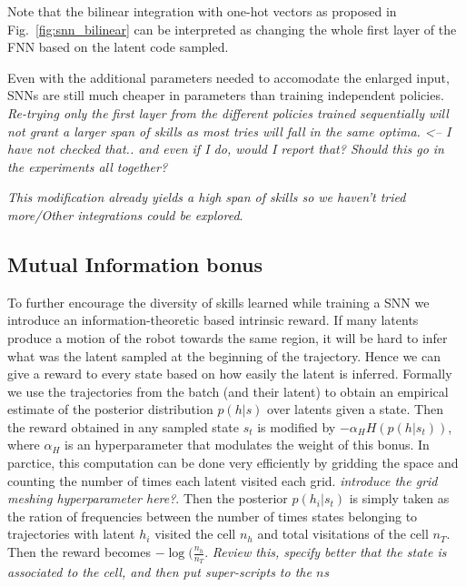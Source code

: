 \documentclass{article} %
\begin{document}
Note that the bilinear integration with one-hot vectors as proposed in Fig.\ \ref{fig:snn_bilinear} can be interpreted as changing the whole first layer of the FNN based on the latent code sampled. 

Even with the additional parameters needed to accomodate the enlarged input, SNNs are still much cheaper in parameters than training independent policies.\textit{ Re-trying only the first layer from the different policies trained sequentially will not grant a larger span of skills as most tries will fall in the same optima. <-- I have not checked that.. and even if I do, would I report that? Should this go in the experiments all together?}

\textit{This modification already yields a high span of skills so we haven't tried more/Other integrations could be explored}.

\subsection{Mutual Information bonus}
To further encourage the diversity of skills learned while training a SNN we introduce an information-theoretic based intrinsic reward. If many latents produce a motion of the robot towards the same region, it will be hard to infer what was the latent sampled at the beginning of the trajectory. Hence we can give a reward to every state based on how easily the latent is inferred. Formally we use the trajectories from the batch (and their latent) to obtain an empirical estimate of the posterior distribution $p(h|s)$ over latents given a state. Then the reward obtained in any sampled state $s_t$ is modified by $-\alpha_H H(p(h|s_t))$, where $\alpha_H$ is an hyperparameter that modulates the weight of this bonus. In parctice, this computation can be done very efficiently by gridding the space and counting the number of times each latent visited each grid. \textit{introduce the grid meshing hyperparameter here?}. Then the posterior $p(h_i|s_t)$ is simply taken as the ration of frequencies between the number of times states belonging to trajectories with latent $h_i$ visited the cell $n_h$ and total visitations of the cell $n_T$. Then the reward becomes $-\log(\frac{n_h}{n_T}$. \textit{Review this, specify better that the state is associated to the cell, and then put super-scripts to the $n$s}
\end{document}
